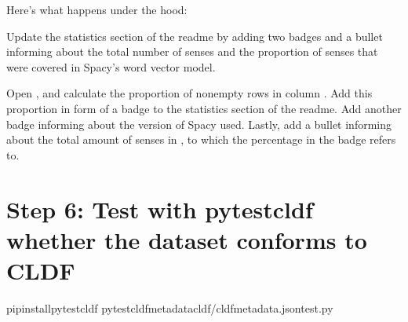 \documentclass[letterpaper,10pt,english]{sphinxmanual}
\begin{document}
\sphinxAtStartPar
Here’s what happens under the hood:

\label{\detokenize{mkcldf:module-gerstnerhungariancommands.update_readme}}
\sphinxAtStartPar
Update the statistics section of the readme by adding two badges and a bullet
informing about the total number of senses and the proportion of senses that
were covered in Spacy’s word vector model.

\begin{fulllineitems}
\label{\detokenize{mkcldf:gerstnerhungariancommands.update_readme.run}}
\pysigstartsignatures
{}
\pysigstopsignatures
\sphinxAtStartPar
Open , and calculate the proportion of non\sphinxhyphen{}empty rows
in column . Add this proportion in form of a badge to the
statistics section of the readme. Add another badge informing about the
version of Spacy used. Lastly, add a bullet informing about the total
amount of senses in , to which the percentage in the
badge refers to.

\end{fulllineitems}



\section{Step 6: Test with pytest\sphinxhyphen{}cldf whether the dataset conforms to CLDF}
\label{\detokenize{mkcldf:step-6-test-with-pytest-cldf-whether-the-dataset-conforms-to-cldf}}
\begin{sphinxVerbatim}[commandchars=\\\{\}]
pipinstallpytest\PYGZhy{}cldf
pytest\PYGZhy{}\PYGZhy{}cldf\PYGZhy{}metadatacldf/cldf\PYGZhy{}metadata.jsontest.py
\end{sphinxVerbatim}
\end{document}

